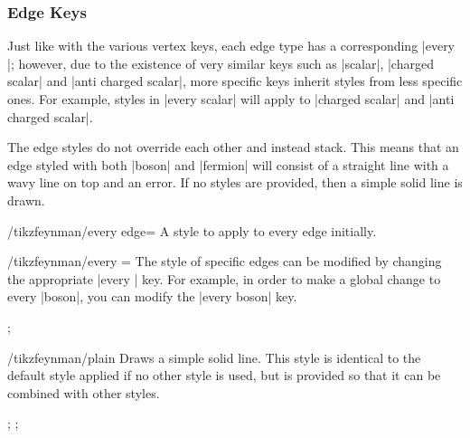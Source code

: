 \documentclass[a4paper,final]{ltxdoc}
\begin{document}
\subsubsection{Edge Keys}
\label{subsubsec:edge_keys}

Just like with the various vertex keys, each edge type has a corresponding
|every |; however, due to the existence of very similar keys
such as |scalar|, |charged scalar| and |anti charged scalar|, more specific keys
inherit styles from less specific ones.  For example, styles in |every scalar|
will apply to |charged scalar| and |anti charged scalar|.

The edge styles do not override each other and instead stack.  This means that
an edge styled with both |boson| and |fermion| will consist of a straight line
with a wavy line on top and an error.  If no styles are provided, then a simple
solid line is drawn.

\begin{key}{/tikzfeynman/every edge=}
  A style to apply to every edge initially.
\end{key}

\begin{stylekey}{/tikzfeynman/every =}
  The style of specific edges can be modified by changing the appropriate
  |every | key.  For example, in order to make a global change
  to every |boson|, you can modify the |every boson| key.

\begin{codeexample}[]
;
\end{codeexample}
\end{stylekey}

\begin{key}{/tikzfeynman/plain}
  Draws a simple solid line.  This style is identical to the default style
  applied if no other style is used, but is provided so that it can be combined
  with other styles.

\begin{codeexample}[]
;
;
\end{codeexample}
\end{key}
\end{document}
